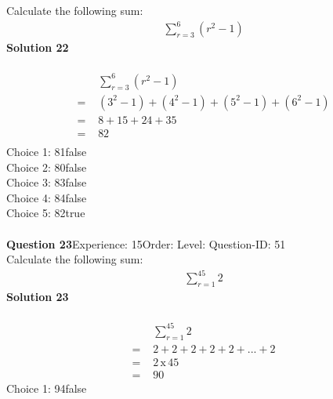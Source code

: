 \documentclass{article}
\begin{document}
Calculate the following sum:
\begin{align*}
\sum_{r=3}^{6} (r^2-1)
\end{align*}
\noindent\textbf{Solution 22}\\[2pt]
\\[-35pt]\begin{align*}
&\sum_{r=3}^{6} (r^2-1)\\[2pt]
=\,\,&(3^2-1)+(4^2-1)+(5^2-1)+(6^2-1)\\[2pt]
=\,\,&8+15+24+35\\[2pt]
=\,\,&82\\[-20pt]
\end{align*}
Choice 1: \hspace{20pt}81\hspace{20pt}false\\
Choice 2: \hspace{20pt}80\hspace{20pt}false\\
Choice 3: \hspace{20pt}83\hspace{20pt}false\\
Choice 4: \hspace{20pt}84\hspace{20pt}false\\
Choice 5: \hspace{20pt}82\hspace{20pt}true\\
\\[4pt]
\noindent\textbf{Question 23}\hspace{20pt}Experience: 15\hspace{20pt}Order: \hspace{20pt}Level: \hspace{20pt}Question-ID: 51\\[2pt]
Calculate the following sum:
\begin{align*}
\sum_{r=1}^{45} 2
\end{align*}
\noindent\textbf{Solution 23}\\[2pt]
\\[-35pt]\begin{align*}
&\sum_{r=1}^{45} 2\\[2pt]
=\,\,&2+2+2+2+2+...+2\\[2pt]
=\,\,&2 \, \text{x} \, 45\\[2pt]
=\,\,&90
\end{align*}
Choice 1: \hspace{20pt}94\hspace{20pt}false\\
\end{document}
